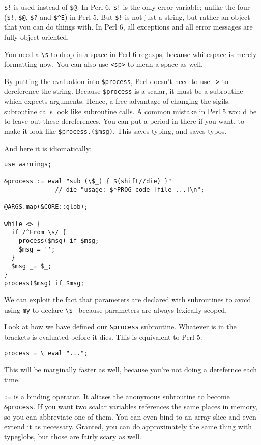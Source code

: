 \documentclass{article}
\newenvironment{example}
  {\addtolength{\linewidth}{-\parindent}%
   \null\begin{minipage}{\linewidth}}
  {\end{minipage}\addtolength{\linewidth}{\parindent}\null}
\begin{document}
\verb'$!' is used instead of \verb'$@'.  In Perl 6, \verb'$!'
is the only error variable;
unlike the four (\verb'$!', \verb'$@', \verb'$?' and \verb'$^E') in Perl 
5.  But \verb'$!' is not just a string, but
rather an object that you can do things with.  In Perl 6, all exceptions
and all error messages are fully object oriented.

You need a \verb'\s' to drop in a space in Perl 6 regexps, because 
whitespace is merely formatting now.
You can also use \verb'<sp>' to mean a space as well.

By putting the evaluation into \verb'$process', Perl doesn't need to 
use \verb'->' to dereference the string.
Because \verb'$process' is a scalar, it must be a subroutine which
expects arguments.  Hence, a free advantage of changing the sigils:
subroutine calls look like subroutine calls.  A common mistake in Perl 5
would be to leave out these 
dereferences.  You can put a period in 
there if you want, to make it look like \verb'$process.($msg)'.
This saves typing, and saves typos.  

\begin{example}
And here it is idiomatically:
\begin{verbatim}
use warnings;

&process := eval "sub (\$_) { $(shift//die) }"
              // die "usage: $*PROG code [file ...]\n";

@ARGS.map(&CORE::glob);

while <> {
  if /^From \s/ {
    process($msg) if $msg;
    $msg = '';
  }
  $msg _= $_;
}
process($msg) if $msg;

\end{verbatim}
\end{example}

We can exploit the fact that parameters are declared with subroutines to
avoid using \verb'my' to declare \verb'\$_' because parameters are 
always lexically scoped.    

Look at how we have defined our \verb'&process' subroutine.  
Whatever is in the brackets is
evaluated before it dies.  This is equivalent to Perl 5: 

\verb'process = \ eval "...";'

\noindent This will be marginally faster as well, because you're not
doing a derefernce each time.

\verb':=' is a binding operator.  It aliases the anonymous subroutine to
become \verb'&process'.  If you want two scalar variables references the
same places in memory, so you can abbreviate one of them.  You can even
bind to an array slice and even extend it as necessary.  Granted, you
can do approximately the same thing with typeglobs, but those are fairly
scary as well.
\end{document}
